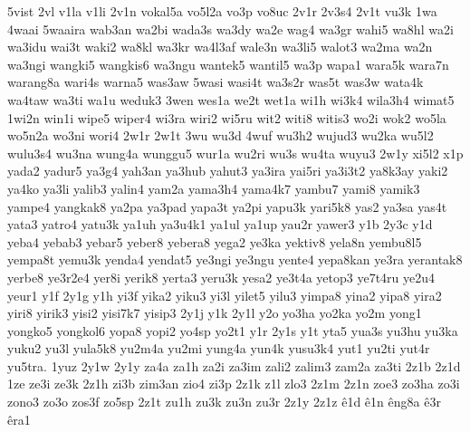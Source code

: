 {5vist 2vl v1la v1li 2v1n vokal5a vo5l2a vo3p vo8uc 2v1r 2v3s4 2v1t vu3k
1wa 4waai 5waaira wab3an wa2bi wada3s wa3dy wa2e wag4 wa3gr wahi5 wa8hl
wa2i wa3idu wai3t waki2 wa8kl wa3kr wa4l3af wale3n wa3li5 walot3 wa2ma
wa2n wa3ngi wangki5 wangkis6 wa3ngu wantek5 wantil5 wa3p wapa1 wara5k
wara7n warang8a wari4s warna5 was3aw 5wasi wasi4t wa3s2r was5t was3w
wata4k wa4taw wa3ti wa1u weduk3 3wen wes1a we2t wet1a wi1h wi3k4 wila3h4
wimat5 1wi2n win1i wipe5 wiper4 wi3ra wiri2 wi5ru wit2 witi8 witis3 wo2i
wok2 wo5la wo5n2a wo3ni wori4 2w1r 2w1t 3wu wu3d 4wuf wu3h2 wujud3 wu2ka
wu5l2 wulu3s4 wu3na wung4a wunggu5 wur1a wu2ri wu3s wu4ta wuyu3 2w1y xi5l2
x1p yada2 yadur5 ya3g4 yah3an ya3hub yahut3 ya3ira yai5ri ya3i3t2 ya8k3ay
yaki2 ya4ko ya3li yalib3 yalin4 yam2a yama3h4 yama4k7 yambu7 yami8 yamik3
yampe4 yangkak8 ya2pa ya3pad yapa3t ya2pi yapu3k yari5k8 yas2 ya3sa yas4t
yata3 yatro4 yatu3k ya1uh ya3u4k1 ya1ul ya1up yau2r yawer3 y1b 2y3c y1d
yeba4 yebab3 yebar5 yeber8 yebera8 yega2 ye3ka yektiv8 yela8n yembu8l5
yempa8t yemu3k yenda4 yendat5 ye3ngi ye3ngu yente4 yepa8kan ye3ra
yerantak8 yerbe8 ye3r2e4 yer8i yerik8 yerta3 yeru3k yesa2 ye3t4a yetop3
ye7t4ru ye2u4 yeur1 y1f 2y1g y1h yi3f yika2 yiku3 yi3l yilet5 yilu3 yimpa8
yina2 yipa8 yira2 yiri8 yirik3 yisi2 yisi7k7 yisip3 2y1j y1k 2y1l y2o
yo3ha yo2ka yo2m yong1 yongko5 yongkol6 yopa8 yopi2 yo4sp yo2t1 y1r 2y1s
y1t yta5 yua3s yu3hu yu3ka yuku2 yu3l yula5k8 yu2m4a yu2mi yung4a yun4k
yusu3k4 yut1 yu2ti yut4r yu5tra. 1yuz 2y1w 2y1y za4a za1h za2i za3im zali2
zalim3 zam2a za3ti 2z1b 2z1d 1ze ze3i ze3k 2z1h zi3b zim3an zio4 zi3p 2z1k
z1l zlo3 2z1m 2z1n zoe3 zo3ha zo3i zono3 zo3o zos3f zo5sp 2z1t zu1h zu3k
zu3n zu3r 2z1y 2z1z ê1d ê1n êng8a ê3r êra1
}%

